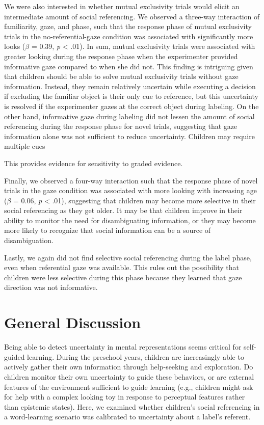 \documentclass[10pt, letterpaper]{article}
\begin{document}
We were also interested in whether mutual exclusivity trials would
elicit an intermediate amount of social referencing. We observed a
three-way interaction of familiarity, gaze, and phase, such that the
response phase of mutual exclusivity trials in the no-referential-gaze
condition was associated with significantly more looks (\(\beta\) =
0.39, \emph{p} \textless{} .01). In sum, mutual exclusivity trials were
associated with greater looking during the response phase when the
experimenter provided informative gaze compared to when she did not.
This finding is intriguing given that children should be able to solve
mutual exclusivity trials without gaze information. Instead, they remain
relatively uncertain while executing a decision if excluding the
familiar object is their only cue to reference, but this uncertainty is
resolved if the experimenter gazes at the correct object during
labeling. On the other hand, informative gaze during labeling did not
lessen the amount of social referencing during the response phase for
novel trials, suggesting that gaze information alone was not sufficient
to reduce uncertainty. Children may require multiple cues

This provides evidence for sensitivity to graded evidence.

Finally, we observed a four-way interaction such that the response phase
of novel trials in the gaze condition was associated with more looking
with increasing age (\(\beta\) = 0.06, \emph{p} \textless{} .01),
suggesting that children may become more selective in their social
referencing as they get older. It may be that children improve in their
ability to monitor the need for disambiguating information, or they may
become more likely to recognize that social information can be a source
of disambiguation.

Lastly, we again did not find selective social referencing during the
label phase, even when referential gaze was available. This rules out
the possibility that children were less selective during this phase
because they learned that gaze direction was not informative.

\section{General Discussion}\label{general-discussion}

Being able to detect uncertainty in mental representations seems
critical for self-guided learning. During the preschool years, children
are increasingly able to actively gather their own information through
help-seeking and exploration. Do children monitor their own uncertainty
to guide these behaviors, or are external features of the environment
sufficient to guide learning (e.g., children might ask for help with a
complex looking toy in response to perceptual features rather than
epistemic states). Here, we examined whether children's social
referencing in a word-learning scenario was calibrated to uncertainty
about a label's referent.
\end{document}
